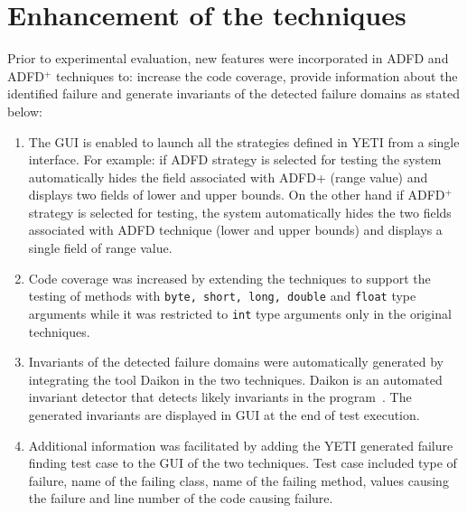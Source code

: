 \section{Enhancement of the techniques}
Prior to experimental evaluation, new features were incorporated in ADFD and ADFD$^+$ techniques to: increase the code coverage, provide information about the identified failure and generate invariants of the detected failure domains as stated below: 
\begin{enumerate}

\item The GUI is enabled to launch all the strategies defined in YETI from a single interface. For example: if ADFD strategy is selected for testing the system automatically hides the field associated with ADFD+ (range value) and displays two fields of lower and upper bounds. On the other hand if ADFD$^+$ strategy is selected for testing, the system automatically hides the two fields associated with ADFD technique (lower and upper bounds) and displays a single field of range value.

\item Code coverage was increased by extending the techniques to support the testing of methods with \verb+byte, short, long, double+ and \verb+float+ type arguments while it was restricted to \verb+int+ type arguments only in the original techniques.

\item Invariants of the detected failure domains were automatically generated by integrating the tool Daikon in the two techniques. Daikon is an automated invariant detector that detects likely invariants in the program~\cite{ernst2007daikon}. The generated invariants are displayed in GUI at the end of test execution. 

\item Additional information was facilitated by adding the YETI generated failure finding test case to the GUI of the two techniques. Test case included type of failure, name of the failing class, name of the failing method, values causing the failure and line number of the code causing failure.





\end{enumerate}
